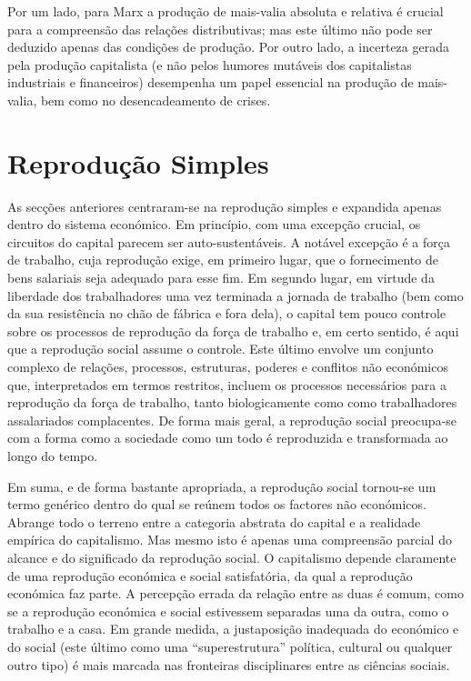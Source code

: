  \par 
Por um lado, para Marx a produção de mais-valia absoluta e relativa é crucial para a compreensão das relações distributivas; mas este último não pode ser deduzido apenas das condições de produção. Por outro lado, a incerteza gerada pela produção capitalista (e não pelos humores mutáveis ​​dos capitalistas industriais e financeiros) desempenha um papel essencial na produção de mais-valia, bem como no desencadeamento de crises.
 \par 
\section{Reprodução Simples}
 \par 
As secções anteriores centraram-se na reprodução simples e expandida apenas dentro do sistema económico. Em princípio, com uma excepção crucial, os circuitos do capital parecem ser auto-sustentáveis. A notável excepção é a força de trabalho, cuja reprodução exige, em primeiro lugar, que o fornecimento de bens salariais seja adequado para esse fim. Em segundo lugar, em virtude da liberdade dos trabalhadores uma vez terminada a jornada de trabalho (bem como da sua resistência no chão de fábrica e fora dela), o capital tem pouco controle sobre os processos de reprodução da força de trabalho e, em certo sentido, é aqui que a reprodução social assume o controle. Este último envolve um conjunto complexo de relações, processos, estruturas, poderes e conflitos não económicos que, interpretados em termos restritos, incluem os processos necessários para a reprodução da força de trabalho, tanto biologicamente como como trabalhadores assalariados complacentes. De forma mais geral, a reprodução social preocupa-se com a forma como a sociedade como um todo é reproduzida e transformada ao longo do tempo.
 \par 
Em suma, e de forma bastante apropriada, a reprodução social tornou-se um termo genérico dentro do qual se reúnem todos os factores não económicos. Abrange todo o terreno entre a categoria abstrata do capital e a realidade empírica do capitalismo. Mas mesmo isto é apenas uma compreensão parcial do alcance e do significado da reprodução social. O capitalismo depende claramente de uma reprodução económica e social satisfatória, da qual a reprodução económica faz parte. A percepção errada da relação entre as duas é comum, como se a reprodução económica e social estivessem separadas uma da outra, como o trabalho e a casa. Em grande medida, a justaposição inadequada do económico e do social (este último como uma “superestrutura” política, cultural ou qualquer outro tipo) é mais marcada nas fronteiras disciplinares entre as ciências sociais.

